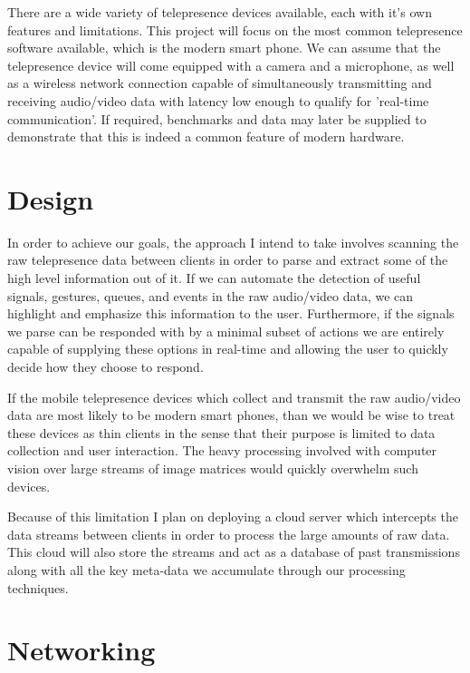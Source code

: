 \documentclass[a4paper,12pt]{report}
\begin{document}
There are a wide variety of telepresence devices available, each with it's own features and limitations. This project will focus on the most common telepresence software available, which is the modern smart phone. We can assume that the telepresence device will come equipped with a camera and a microphone, as well as a wireless network connection capable of simultaneously transmitting and receiving audio/video data with latency low enough to qualify for 'real-time communication'. If required, benchmarks and data may later be supplied to demonstrate that this is indeed a common feature of modern hardware.

\section{Design}

In order to achieve our goals, the approach I intend to take involves scanning the raw telepresence data between clients in order to parse and extract some of the high level information out of it. If we can automate the detection of useful signals, gestures, queues, and events in the raw audio/video data, we can highlight and emphasize this information to the user. Furthermore, if the signals we parse can be responded with by a minimal subset of actions we are entirely capable of supplying these options in real-time and allowing the user to quickly decide how they choose to respond.
 
If the mobile telepresence devices which collect and transmit the raw audio/video data are most likely to be modern smart phones, than we would be wise to treat these devices as thin clients in the sense that their purpose is limited to data collection and user interaction. The heavy processing involved with computer vision over large streams of image matrices would quickly overwhelm such devices.

Because of this limitation I plan on deploying a cloud server which intercepts the data streams between clients in order to process the large amounts of raw data. This cloud will also store the streams and act as a database of past transmissions along with all the key meta-data we accumulate through our processing techniques.
\section{Networking}
\end{document}
